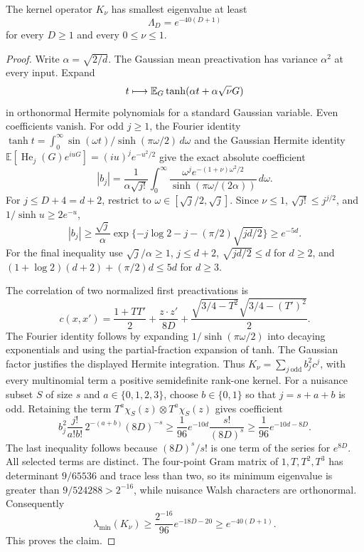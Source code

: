 \begin{lemma}
\label{lem:gaussian-feature-kernel}
The kernel operator $K_\nu$ has smallest eigenvalue at least
\[
 \Lambda_D=e^{-40(D+1)}
\]
for every $D\ge1$ and every $0\le\nu\le1$.
\end{lemma}
\begin{proof}
Write $\alpha=\sqrt{2/d}$. The Gaussian mean preactivation has variance $\alpha^2$ at every input. Expand
\[
 t\longmapsto\mathbb E_G\tanh(\alpha t+\alpha\sqrt\nu G)
\]
in orthonormal Hermite polynomials for a standard Gaussian variable. Even coefficients vanish. For odd $j\ge1$, the Fourier identity $\tanh t=\int_0^\infty\sin(\omega t)/\sinh(\pi\omega/2)\,d\omega$ and the Gaussian Hermite identity $\mathbb E[\operatorname{He}_j(G)e^{iuG}]=(iu)^j e^{-u^2/2}$ give the exact absolute coefficient
\[
 |b_j|=\frac1{\alpha\sqrt{j!}}\int_0^\infty
 \frac{\omega^j e^{-(1+\nu)\omega^2/2}}
      {\sinh(\pi\omega/(2\alpha))}\,d\omega.
\]
For $j\le D+4=d+2$, restrict to $\omega\in[\sqrt j/2,\sqrt j]$. Since $\nu\le1$, $\sqrt{j!}\le j^{j/2}$, and $1/\sinh u\ge2e^{-u}$,
\[
 |b_j|\ge\frac{\sqrt j}{\alpha}
       \exp\{-j\log2-j-(\pi/2)\sqrt{jd/2}\}\ge e^{-5d}.
\]
For the final inequality use $\sqrt j/\alpha\ge1$, $j\le d+2$, $\sqrt{jd/2}\le d$ for $d\ge2$, and
$(1+\log2)(d+2)+(\pi/2)d\le5d$ for $d\ge3$.

The correlation of two normalized first preactivations is
\[
 c(x,x')=\frac{1+TT'}2+\frac{z\cdot z'}{8D}
            +\frac{\sqrt{3/4-T^2}\sqrt{3/4-(T')^2}}2.
\]
The Fourier identity follows by expanding $1/\sinh(\pi\omega/2)$ into decaying exponentials and using the partial-fraction expansion of tanh. The Gaussian factor justifies the displayed Hermite integration. Thus $K_\nu=\sum_{j\ \mathrm{odd}}b_j^2c^j$, with every multinomial term a positive semidefinite rank-one kernel. For a nuisance subset $S$ of size $s$ and $a\in\{0,1,2,3\}$, choose $b\in\{0,1\}$ so that $j=s+a+b$ is odd. Retaining the term $T^a\chi_S(z)\otimes T^a\chi_S(z)$ gives coefficient
\[
 b_j^2\frac{j!}{a!b!}\,2^{-(a+b)}(8D)^{-s}
 \ge \frac1{96}e^{-10d}\frac{s!}{(8D)^s}
 \ge\frac1{96}e^{-10d-8D}.
\]
The last inequality follows because $(8D)^s/s!$ is one term of the series for $e^{8D}$. All selected terms are distinct. The four-point Gram matrix of $1,T,T^2,T^3$ has determinant $9/65536$ and trace less than two, so its minimum eigenvalue is greater than $9/524288>2^{-16}$, while nuisance Walsh characters are orthonormal. Consequently
\[
 \lambda_{\min}(K_\nu)
 \ge\frac{2^{-16}}{96}e^{-18D-20}\ge e^{-40(D+1)}.
\]
This proves the claim.
\end{proof}

